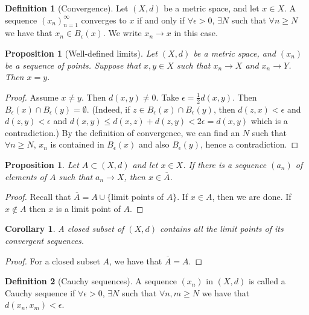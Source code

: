 \documentclass{article}
\theoremstyle{definition}
\newtheorem{defn}{Definition}[section]
\theoremstyle{plain}%
\newtheorem{prop}[thm]{Proposition}
\newtheorem*{cor}{Corollary}
\theoremstyle{remark}
\newcommand{\union}{\cup}
\begin{document}
\begin{defn}[Convergence]
Let $(X,d)$ be a metric space, and let $x \in X$. A sequence $(x_n)_{n=1}^{\infty}$ converges to $x$ if and only if $\forall \epsilon > 0$, $\exists N$ such that $\forall n \ge N$ we have that $x_n \in B_{\epsilon}(x)$. We write $x_n \to x$ in this case.
\end{defn}

\begin{prop}[Well-defined limits]
Let $(X,d)$ be a metric space, and $(x_n)$ be a sequence of points. Suppose that $x,y \in X$ such that $x_n \to X$ and $x_n \to Y$. Then $x=y$.
\end{prop}

\begin{proof}
Assume $x \ne y$. Then $d(x,y) \ne 0$. Take $\epsilon = \frac{1}{2} d(x,y)$. Then $B_{\epsilon}(x) \cap B_{\epsilon}(y) = \emptyset$. (Indeed, if $z \in B_{\epsilon}(x) \cap B_{\epsilon}(y)$, then $d(z,x) < \epsilon$ and $d(z,y) < \epsilon$ and $d(x,y) \le d(x,z) + d(z,y) < 2\epsilon = d(x,y)$ which is a contradiction.) By the definition of convergence, we can find an $N$ such that $\forall n \ge N$, $x_n$ is contained in $B_{\epsilon}(x)$ and also $B_{\epsilon}(y)$, hence a contradiction.
\end{proof}

\begin{prop}
Let $A \subset (X,d)$ and let $x \in X$. If there is a sequence $(a_n)$ of elements of $A$ such that $a_n \to X$, then $x \in \overline{A}$.
\end{prop}

\begin{proof}
Recall that $\overline{A} = A \union \{$limit points of $A \}$. If $x \in A$, then we are done. If $x \not\in A$ then $x$ is a limit point of $A$.
\end{proof}

\begin{cor}
A closed subset of $(X,d)$ contains all the limit points of its convergent sequences.
\end{cor}

\begin{proof}
For a closed subset $A$, we have that $\overline{A} = A$.
\end{proof}

\begin{defn}[Cauchy sequences]
A sequence $(x_n)$ in $(X,d)$ is called a Cauchy sequence if $\forall \epsilon > 0$, $\exists N$ such that $\forall n, m \ge N$ we have that $d(x_n, x_m) < \epsilon$.
\end{defn}
\end{document}
